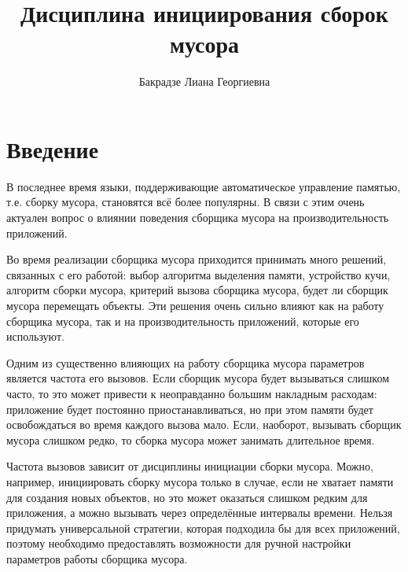 
\title{Дисциплина инициирования сборок мусора}
%
\author{Бакрадзе Лиана Георгиевна}
%
%

%
%

\maketitle              %

\begin{abstract}
\end{abstract}
%

\section*{Введение}

В последнее время языки, поддерживающие автоматическое управление памятью, т.е. сборку 
мусора, становятся всё более популярны. В связи с этим очень актуален вопрос о влиянии
поведения сборщика мусора на производительность приложений.

Во время реализации сборщика мусора приходится принимать много решений,
связанных с его работой: выбор алгоритма выделения памяти, устройство кучи, 
алгоритм сборки мусора, критерий вызова сборщика мусора, будет ли сборщик мусора 
перемещать объекты. Эти решения очень сильно влияют как на работу сборщика мусора, 
так и на
производительность приложений, которые его используют.

Одним из существенно влияющих на работу сборщика мусора параметров
является частота его вызовов. Если 
сборщик мусора будет вызываться слишком часто, то это может привести к неоправданно
большим накладным расходам: приложение будет постоянно приостанавливаться, но при 
этом памяти будет освобождаться во время каждого вызова мало. Если, наоборот, вызывать 
сборщик мусора слишком редко, то сборка мусора может занимать длительное время. 

Частота вызовов
зависит от дисциплины инициации сборки мусора. Можно, например, инициировать сборку
мусора только в случае, если не хватает памяти для создания новых объектов, но это может 
оказаться слишком редким для приложения, а можно вызывать через определённые интервалы времени.
Нельзя придумать универсальной стратегии, которая подходила бы для всех приложений, поэтому
необходимо
предоставлять возможности для ручной настройки параметров работы сборщика мусора. 

